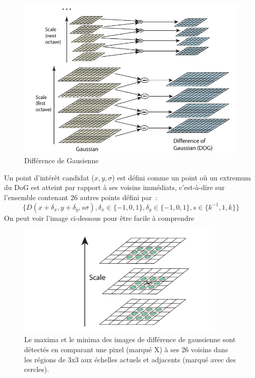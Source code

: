 \begin{figure}[ht!]
\centering
\includegraphics[width=150mm]{images/dog}
\caption{Différence de Gausienne \cite{low04}}
\label{overflow}
\end{figure}

Un point d'intérêt candidat ($x,y,\sigma$) est défini comme un point où un extremum du DoG est atteint par rapport à ses voisins immédiats, c'est-à-dire sur l'ensemble contenant 26 autres points défini par~:
\[
\{ D \left( x + \delta_x, y + \delta_y, s \sigma \right), \delta_x \in \{-1, 0, 1\}, \delta_y \in \{-1,0, 1\}, s \in \{k^{-1}, 1, k\} \} 
\]
On peut voir l'image ci-dessous pour être facile à comprendre
\begin{figure}[ht!]
\centering
\includegraphics[width=100mm]{images/select_point}
\caption{\cite{low04} Le maxima et le minima des images de différence de gaussienne sont détectés en comparant une
pixel (marqué X) à ses 26 voisins dans les régions de 3x3 aux échelles actuels et adjacents (marqué avec des cercles).}
\label{overflow}
\end{figure}

\pagebreak
